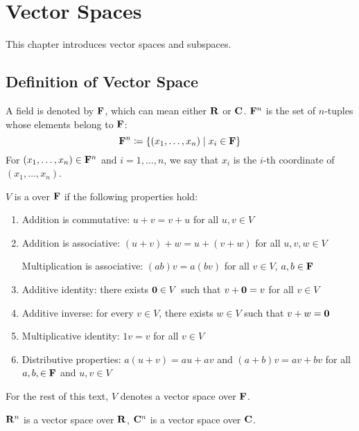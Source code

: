 \chapter{Vector Spaces}\label{chap:vector-spaces}
This chapter introduces vector spaces and subspaces.

\section{Definition of Vector Space}
\begin{notation}
A field is denoted by $\mathbf F$, which can mean either $\mathbf R$ or $\mathbf C$. $\mathbf F^n$ is the set of $n$-tuples whose elements belong to $\mathbf F$:
\[\mathbf F^n\coloneqq\{(x_1,\dots,x_n)\mid x_i\in\mathbf F\}\]
For $(x_1,\dots,x_n)\in\mathbf F^n$ and $i=1,\dots,n$, we say that $x_i$ is the $i$-th coordinate of $(x_1,\dots,x_n)$.
\end{notation}

\begin{definition}
$V$ is a  over $\mathbf F$ if the following properties hold:
\begin{enumerate}[label=(\roman*)]
\item Addition is commutative: $u+v=v+u$ for all $u,v\in V$
\item Addition is associative: $(u+v)+w=u+(v+w)$ for all $u,v,w\in V$

Multiplication is associative: $(ab)v=a(bv)$ for all $v\in V$, $a,b\in\mathbf F$
\item Additive identity: there exists $\vb{0}\in V$ such that $v+\vb{0}=v$ for all $v\in V$
\item Additive inverse: for every $v\in V$, there exists $w\in V$ such that $v+w=\vb{0}$
\item Multiplicative identity: $1v=v$ for all $v\in V$
\item Distributive properties: $a(u+v)=au+av$ and $(a+b)v=av+bv$ for all $a,b,\in\mathbf F$ and $u,v\in V$
\end{enumerate}
\end{definition}

\begin{notation}
For the rest of this text, $V$ denotes a vector space over $\mathbf F$.
\end{notation}

\begin{example}
$\mathbf R^n$ is a vector space over $\mathbf R$, $\mathbf C^n$ is a vector space over $\mathbf C$.
\end{example}

